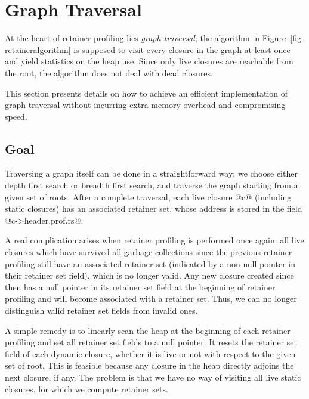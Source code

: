 \documentclass{article}
\begin{document}
\section{Graph Traversal}

At the heart of retainer profiling lies \emph{graph traversal};
the algorithm in Figure~\ref{fig-retaineralgorithm} is supposed to visit
every closure in the graph at least once and yield statistics on the heap use.
Since only live closures are reachable from the root, the algorithm
does not deal with dead closures.

This section presents details on how to achieve an efficient implementation of 
graph traversal without incurring extra memory overhead and compromising speed.

\subsection{Goal}

Traversing a graph itself can be done in a straightforward way;
we choose either depth first search or breadth first search, and traverse
the graph starting from a given set of roots.
After a complete traversal, each live closure @c@ (including static closures)
has an associated retainer set, whose address is stored in the field
@c->header.prof.rs@. 

A real complication arises when retainer profiling is performed once again:
all live closures which have survived all garbage collections since 
the previous retainer profiling 
still have an associated retainer set (indicated by
a non-null pointer in their retainer set field), which is no longer
valid. Any new closure created since then has
a null pointer in its retainer set field at the beginning of retainer 
profiling and will become associated with a retainer set.
Thus, we can no longer distinguish valid retainer set fields
from invalid ones. 

A simple remedy is to linearly scan the heap at the beginning of each 
retainer profiling and set all retainer set fields to a null pointer.
It resets the retainer set field of each dynamic closure, whether it is
live or not with respect to the given set of root.
This is feasible because any closure in the heap directly adjoins the
next closure, if any.
The problem is that we have no way of visiting all live static closures,
for which we compute retainer sets.
\end{document}
